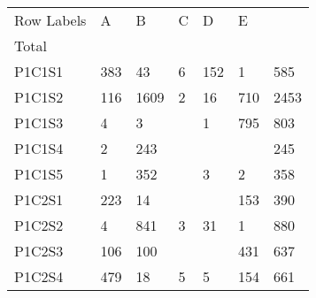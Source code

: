 \begin{longtable}{lllllll}
\hline
Row Labels & A & B & C & D & E & \begin{tabular}[c]{@{}l@{}}Grand\\   Total\end{tabular} \\ \hline
\endfirsthead
%
\endhead
%
\multicolumn{1}{|l|}{P1C1S1} & \multicolumn{1}{l|}{383} & \multicolumn{1}{l|}{43} & \multicolumn{1}{l|}{6} & \multicolumn{1}{l|}{152} & \multicolumn{1}{l|}{1} & \multicolumn{1}{l|}{585} \\ \hline
\multicolumn{1}{|l|}{P1C1S2} & \multicolumn{1}{l|}{116} & \multicolumn{1}{l|}{1609} & \multicolumn{1}{l|}{2} & \multicolumn{1}{l|}{16} & \multicolumn{1}{l|}{710} & \multicolumn{1}{l|}{2453} \\ \hline
\multicolumn{1}{|l|}{P1C1S3} & \multicolumn{1}{l|}{4} & \multicolumn{1}{l|}{3} & \multicolumn{1}{l|}{} & \multicolumn{1}{l|}{1} & \multicolumn{1}{l|}{795} & \multicolumn{1}{l|}{803} \\ \hline
\multicolumn{1}{|l|}{P1C1S4} & \multicolumn{1}{l|}{2} & \multicolumn{1}{l|}{243} & \multicolumn{1}{l|}{} & \multicolumn{1}{l|}{} & \multicolumn{1}{l|}{} & \multicolumn{1}{l|}{245} \\ \hline
\multicolumn{1}{|l|}{P1C1S5} & \multicolumn{1}{l|}{1} & \multicolumn{1}{l|}{352} & \multicolumn{1}{l|}{} & \multicolumn{1}{l|}{3} & \multicolumn{1}{l|}{2} & \multicolumn{1}{l|}{358} \\ \hline
\multicolumn{1}{|l|}{P1C2S1} & \multicolumn{1}{l|}{223} & \multicolumn{1}{l|}{14} & \multicolumn{1}{l|}{} & \multicolumn{1}{l|}{} & \multicolumn{1}{l|}{153} & \multicolumn{1}{l|}{390} \\ \hline
\multicolumn{1}{|l|}{P1C2S2} & \multicolumn{1}{l|}{4} & \multicolumn{1}{l|}{841} & \multicolumn{1}{l|}{3} & \multicolumn{1}{l|}{31} & \multicolumn{1}{l|}{1} & \multicolumn{1}{l|}{880} \\ \hline
\multicolumn{1}{|l|}{P1C2S3} & \multicolumn{1}{l|}{106} & \multicolumn{1}{l|}{100} & \multicolumn{1}{l|}{} & \multicolumn{1}{l|}{} & \multicolumn{1}{l|}{431} & \multicolumn{1}{l|}{637} \\ \hline
\multicolumn{1}{|l|}{P1C2S4} & \multicolumn{1}{l|}{479} & \multicolumn{1}{l|}{18} & \multicolumn{1}{l|}{5} & \multicolumn{1}{l|}{5} & \multicolumn{1}{l|}{154} & \multicolumn{1}{l|}{661} \\ \hline

\end{longtable}
